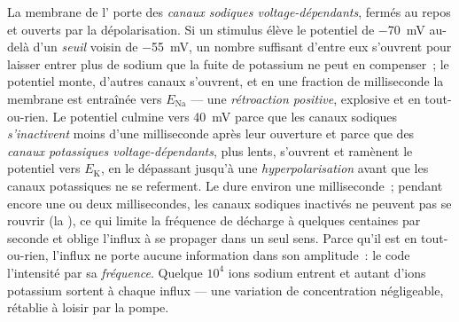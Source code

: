 \begin{proposition}\label{prop:b2:neurons-synapses:ap}
La membrane de l' porte des \emph{canaux sodiques voltage-dépendants},
fermés au repos et ouverts par la dépolarisation. Si un stimulus élève
le potentiel de \qty{-70}{mV} au-delà d'un \emph{seuil} voisin de
\qty{-55}{mV}, un nombre suffisant d'entre eux s'ouvrent pour laisser
entrer plus de sodium que la fuite de potassium ne peut en compenser~; le
potentiel monte, d'autres canaux s'ouvrent, et en une fraction de
milliseconde la membrane est entraînée vers
$E_{\mathrm{Na}}$ --- une \emph{rétroaction positive}, explosive
et en tout-ou-rien. Le potentiel culmine vers \qty{+40}{mV} parce que les
canaux sodiques \emph{s'inactivent} moins d'une milliseconde après leur
ouverture et parce que des \emph{canaux potassiques voltage-dépendants},
plus lents, s'ouvrent et ramènent le potentiel vers $E_{\mathrm K}$, en
le dépassant jusqu'à une \emph{hyperpolarisation} avant que les canaux
potassiques ne se referment. Le \emph{} dure environ une
milliseconde~; pendant encore une ou deux millisecondes, les canaux
sodiques inactivés ne peuvent pas se rouvrir (la \emph{}), ce qui limite la fréquence de décharge à quelques
centaines par seconde et oblige l'influx à se propager dans un seul
sens. Parce qu'il est en tout-ou-rien, l'influx ne porte aucune
information dans son amplitude~: le  code l'intensité par sa
\emph{fréquence}. Quelque
$10^{4}$ ions sodium entrent et autant d'ions potassium sortent à chaque
influx --- une variation de concentration négligeable, rétablie à loisir
par la pompe.
\end{proposition}
